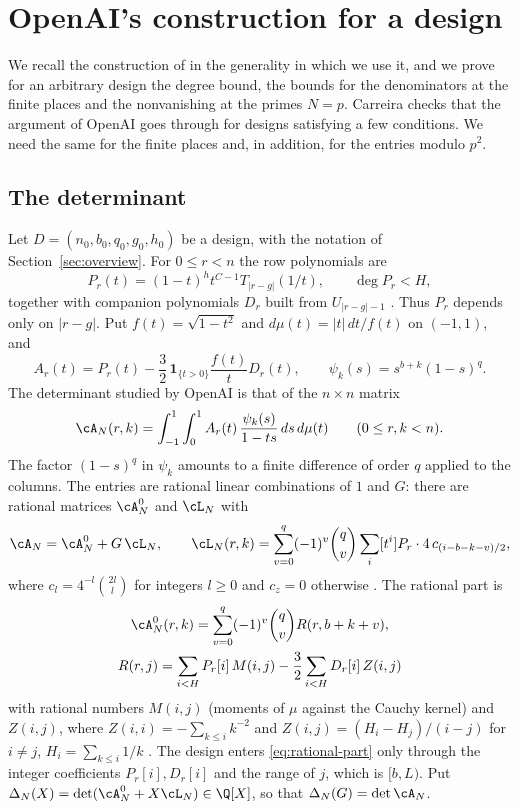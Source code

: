\section{OpenAI's construction for a design}\label{sec:setup}

We recall the construction of \cite{OpenAI2026} in the generality in which we use it, and we prove for an
arbitrary design the degree bound, the bounds for the denominators at the finite places and the
nonvanishing at the primes $N=p$. Carreira \cite{Carreira2026} checks that the argument of OpenAI goes
through for designs satisfying a few conditions. We need the same for the finite places and, in addition,
for the entries modulo $p^2$.

\subsection{The determinant}
Let $D=(n_0,b_0,q_0,g_0,h_0)$ be a design, with the notation of Section~\ref{sec:overview}. For $0\le r<n$
the row polynomials are
\begin{equation}\label{eq:rows}
 P_r(t)=(1-t)^ht^{C-1}T_{|r-g|}(1/t),\qquad \deg P_r<H,
\end{equation}
together with companion polynomials $D_r$ built from $U_{|r-g|-1}$ \cite[(3)]{OpenAI2026}. Thus
$P_r$ depends only on $|r-g|$. Put $f(t)=\sqrt{1-t^2}$ and $d\mu(t)=|t|\,dt/f(t)$ on $(-1,1)$, and
\[
 A_r(t)=P_r(t)-\frac32\,\mathbf 1_{\{t>0\}}\frac{f(t)}{t}D_r(t),\qquad
 \psi_k(s)=s^{b+k}(1-s)^q .
\]
The determinant studied by OpenAI is that of the $n\times n$ matrix
\begin{equation}\label{eq:matrix}
 \cA_N(r,k)=\int_{-1}^1\int_0^1 A_r(t)\,\frac{\psi_k(s)}{1-ts}\,ds\,d\mu(t)
 \qquad(0\le r,k<n).
\end{equation}
The factor $(1-s)^q$ in $\psi_k$ amounts to a finite difference of order $q$ applied to the columns.
The entries are rational linear combinations of $1$ and $G$: there are rational matrices $\cA^0_N$
and $\cL_N$ with
\begin{equation}\label{eq:L}
 \cA_N=\cA^0_N+G\,\cL_N,\qquad
 \cL_N(r,k)=\sum_{v=0}^{q}(-1)^v\binom qv\sum_{i}[t^i]P_r\cdot4\,c_{(i-b-k-v)/2},
\end{equation}
where $c_l=4^{-l}\binom{2l}{l}$ for integers $l\ge0$ and $c_z=0$ otherwise
\cite[Prop.~2.1 and (20)]{OpenAI2026}. The rational part is
\begin{equation}\label{eq:rational-part}
 \begin{gathered}
 \cA^0_N(r,k)=\sum_{v=0}^q(-1)^v\binom qv R(r,b+k+v),\\
 R(r,j)=\sum_{i<H}P_r[i]\,M(i,j)-\frac32\sum_{i<H}D_r[i]\,Z(i,j)
 \end{gathered}
\end{equation}
with rational numbers $M(i,j)$ (moments of $\mu$ against the Cauchy kernel) and $Z(i,j)$, where
$Z(i,i)=-\sum_{k\le i}k^{-2}$ and $Z(i,j)=(H_i-H_j)/(i-j)$ for $i\ne j$, $H_i=\sum_{k\le i}1/k$
\cite[Prop.~2.1]{OpenAI2026}. The design enters \eqref{eq:rational-part} only through the integer
coefficients $P_r[i],D_r[i]$ and the range of $j$, which is $[b,L)$. Put
$\Delta_N(X)=\det(\cA^0_N+X\cL_N)\in\Q[X]$, so that $\Delta_N(G)=\det\cA_N$.

